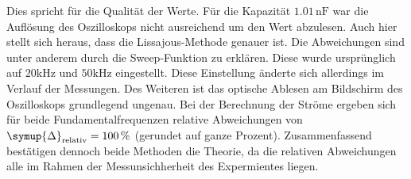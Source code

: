 Dies spricht für die Qualität der Werte. Für die Kapazität $1.01\, \unit{\nano\farad}$ war die Auflösung des Oszilloskops nicht ausreichend um den Wert abzulesen. Auch hier stellt sich heraus, 
dass die Lissajous-Methode 
genauer ist. Die Abweichungen sind unter anderem durch die Sweep-Funktion zu erklären. Diese wurde ursprünglich auf $20 \unit{\kilo\hertz}$ und $50 \unit{\kilo\hertz}$ eingestellt. 
Diese Einstellung änderte sich allerdings im Verlauf der Messungen. Des Weiteren ist das optische Ablesen am Bildschirm des Oszilloskops grundlegend ungenau.
Bei der Berechnung der Ströme ergeben sich für beide Fundamentalfrequenzen relative Abweichungen von $\symup{\Delta}_\text{relativ} = \qty{100}{\percent}$ 
(gerundet auf ganze Prozent).
Zusammenfassend bestätigen dennoch beide Methoden die Theorie, da die relativen Abweichungen alle im Rahmen der Messunsichherheit des Expermientes liegen.
